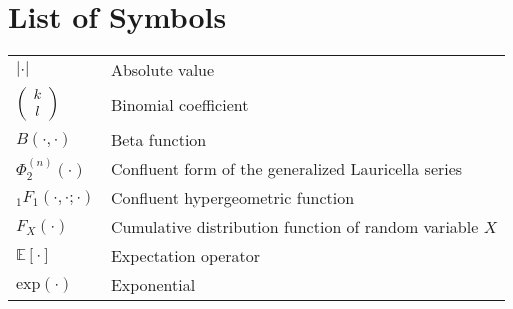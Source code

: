 \chapter*{List of Symbols}

\begin{longtable}{ll}

$|\cdot|$          &    Absolute value\\
$\left( {\begin{array}{*{20}c}
                   k\\ l\\ \end{array}} \right) $  & Binomial coefficient\\
$B(\cdot,\cdot)$ & Beta function\\
$\Phi_2^{(n)}(\cdot)$ & Confluent form of the generalized Lauricella series\\
${}_1F_1(\cdot, \cdot;\cdot)$   & Confluent hypergeometric function  \\
$F_{X}(\cdot)$ & Cumulative distribution function of random variable $X$\\
$\mathbb{E}[\cdot]$                  &      Expectation operator\\
$\text{exp}(\cdot)$                &     Exponential\\


\end{longtable}


























